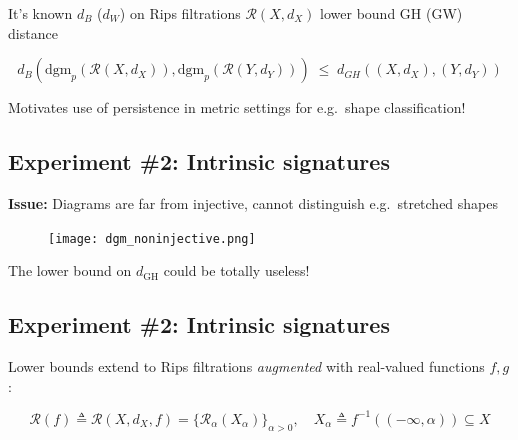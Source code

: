 \documentclass[
  letterpaper,
  DIV=11,
  numbers=noendperiod,
  oneside]{scrartcl}
\begin{document}
It's known \(d_B\) (\(d_W\)) on Rips filtrations \(\mathcal{R}(X, d_X)\)
lower bound GH (GW) distance

\[ 
d_B(\mathrm{dgm}_p(\mathcal{R}(X, d_X)), \mathrm{dgm}_p(\mathcal{R}(Y, d_Y))) \; \leq \; d_{GH}((X, d_X), (Y, d_Y))
\]

\begin{figure}

\begin{minipage}[t]{\linewidth}

{\centering 


}

\end{minipage}%

\end{figure}

Motivates use of persistence in metric settings for e.g.~shape
classification!

\hypertarget{experiment-2-intrinsic-signatures-3}{%
\subsection{Experiment \#2: Intrinsic
signatures}\label{experiment-2-intrinsic-signatures-3}}

\textbf{Issue:} Diagrams are far from injective, cannot distinguish
e.g.~stretched shapes

\begin{figure}

{\centering \texttt{[image: dgm\_noninjective.png]}

}

\end{figure}

The lower bound on \(d_{\mathrm{GH}}\) could be totally useless!

\hypertarget{experiment-2-intrinsic-signatures-4}{%
\subsection{Experiment \#2: Intrinsic
signatures}\label{experiment-2-intrinsic-signatures-4}}

Lower bounds extend to Rips filtrations \emph{augmented} with
real-valued functions \(f, g\):

\[
\mathcal{R}(f) \triangleq \mathcal{R}(X, d_X, f) = \{\mathcal{R}_\alpha(X_\alpha)\}_{\alpha > 0}, \quad X_\alpha \triangleq f^{-1}((-\infty, \alpha)) \subseteq X
\]
\end{document}
